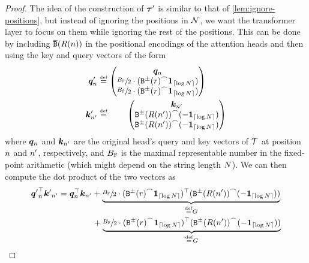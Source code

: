 \begin{proof}
   The idea of the construction of ${{\boldsymbol{\tau}}}'$ is similar to that of \cref{lem:ignore-positions}, but instead of ignoring the positions in ${{{\mathcal{N}}}}$, we want the transformer layer to focus on them while ignoring the rest of the positions.
   This can be done by including $\fullBinEnc{R(\stridx)}$ in the positional encodings of the attention heads and then using the key and query vectors of the form
   \begin{subequations}
      \begin{align}
         \vq'_\stridx &\defeq 
         \begin{pmatrix}
            \vq_\stridx \\
            \sfrac{\maxFNum}{2} \cdot (\interleaveFun{\sbinFun{r}}{\one_{\ceil{\log\strlen}}}) \\
            \sfrac{\maxFNum}{2} \cdot (\interleaveFun{\sbinFun{r}}{\one_{\ceil{\log\strlen}}}) \\
         \end{pmatrix} \\
         \vk'_{\stridx'} &\defeq \phantom{\sfrac{\maxFNum}{2} \cdot} 
         \begin{pmatrix}
            \vk_{\stridx'} \\
            \interleaveFun{\sbinFun{R(\stridx')}}{(-\one_{\ceil{\log\strlen}})} \\
            \interleaveFun{\sbinFun{R(\stridx')}}{(-\one_{\ceil{\log\strlen}})} \\
         \end{pmatrix}
      \end{align}
   \end{subequations}
   where ${{{\bm{q}}}}_{{n}}$ and ${{{\bm{k}}}}_{{{n}}'}$ are the original head's query and key vectors of ${{\mathcal{T}}}$ at position ${{n}}$ and ${{n}}'$, respectively, and ${{B_{{{\mathbb{F}}}}}}$ is the maximal representable number in the fixed-point arithmetic (which might depend on the string length ${{N}}$).
   We can then compute the dot product of the two vectors as
   \begin{subequations}
      \begin{align}
         \inner{{\vq'}_\stridx}{{\vk'}_{\stridx'}} 
         &= \inner{\vq_\stridx}{\vk_{\stridx'}} + \underbrace{\sfrac{\maxFNum}{2} \cdot \inner{(\interleaveFun{\sbinFun{r}}{\one_{\ceil{\log\strlen}}})}{(\interleaveFun{\sbinFun{R(\stridx')}}{(-\one_{\ceil{\log\strlen}})})}}_{\defeq G} \label{eq:focusing-attention-dot-product} \\
         & \phantom{= \inner{\vq_\stridx}{\vk_{\stridx'}}} \ + \underbrace{\sfrac{\maxFNum}{2} \cdot \inner{(\interleaveFun{\sbinFun{r}}{\one_{\ceil{\log\strlen}}})}{(\interleaveFun{\sbinFun{R(\stridx')}}{(-\one_{\ceil{\log\strlen}})})}}_{\defeq G}  \nonumber
      \end{align}
   \end{subequations}
   

\end{proof}
